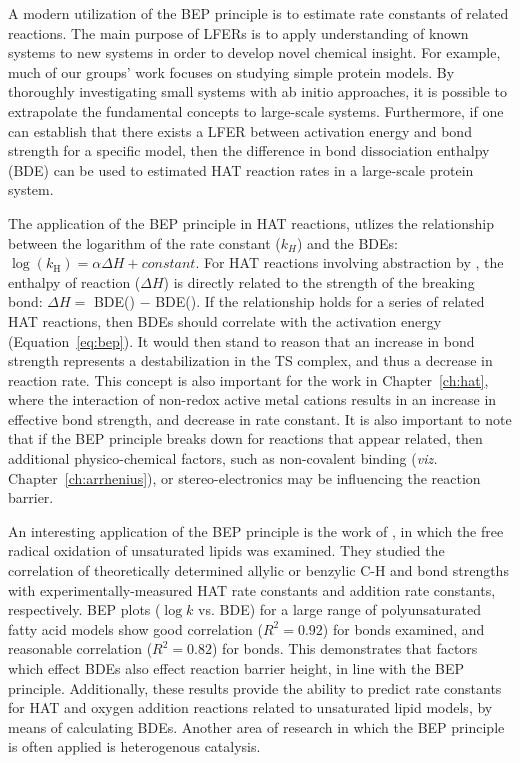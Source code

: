 A modern utilization of the BEP principle is to estimate rate constants of
related reactions. The main purpose of LFERs is to apply understanding of known
systems to new systems in order to develop novel chemical insight. For example,
much of our groups' work focuses on studying simple protein models. By
thoroughly investigating small systems with ab initio approaches, it is possible
to extrapolate the fundamental concepts to large-scale systems. Furthermore, if
one can establish that there exists a LFER between activation energy and bond
strength for a specific model, then the difference in bond dissociation enthalpy
(BDE) can be used to estimated HAT reaction rates in a large-scale protein
system.

The application of the BEP principle in HAT reactions, utlizes the relationship
between the logarithm of the rate constant ($k_H$) and the BDEs:
$\log(k_\mathrm{H}) = \alpha \Delta H + constant$. For HAT reactions involving
abstraction by \cumo, the enthalpy of reaction ($\Delta H$) is directly related
to the strength of the breaking bond: $\Delta H =$ BDE() $-$
BDE(). If the relationship holds for a series of related HAT
reactions, then BDEs should correlate with the activation energy
(Equation~\ref{eq:bep}). It would then stand to reason that an increase in bond
strength represents a destabilization in the TS complex, and thus a decrease in
reaction rate. This concept is also important for the work in
Chapter~\ref{ch:hat}, where the interaction of non-redox active metal cations
results in an increase in effective bond strength, and decrease in rate
constant. It is also important to note that if the BEP principle breaks down for
reactions that appear related, then additional physico-chemical factors, such as
non-covalent binding (\emph{viz.} Chapter~\ref{ch:arrhenius}), or
stereo-electronics may be influencing the reaction barrier.

An interesting application of the BEP principle is the work of
\citet{Pratt2003}, in which the free radical oxidation of unsaturated lipids was
examined. They studied the correlation of theoretically determined allylic or
benzylic C-H and  bond strengths with experimentally-measured HAT
rate constants and  addition rate constants, respectively. BEP plots
($\log k$ vs. BDE) for a large range of polyunsaturated fatty acid models show
good correlation ($R^2 = 0.92$) for  bonds examined, and reasonable
correlation ($R^2 = 0.82$) for  bonds. This demonstrates that factors
which effect BDEs also effect reaction barrier height, in line with the BEP
principle. Additionally, these results provide the ability to predict rate
constants for HAT and oxygen addition reactions related to unsaturated lipid
models, by means of calculating BDEs. Another area of research in which the BEP
principle is often applied is heterogenous catalysis.\cite{Panov2015}

